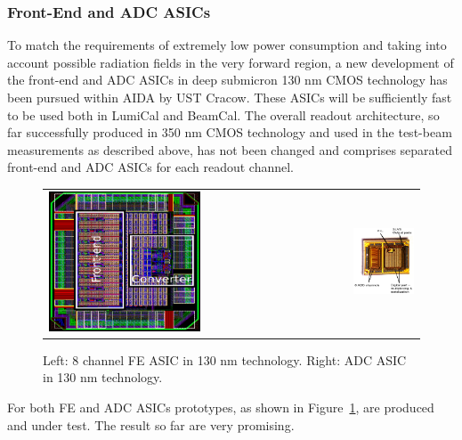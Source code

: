 \subsubsection{Front-End and ADC ASICs}



To match the requirements of extremely low power consumption and taking into account possible radiation
fields in the very forward region, a new development of the front-end and ADC ASICs in deep submicron
130 nm CMOS technology has been
pursued within AIDA by UST Cracow.
These ASICs will be sufficiently fast to be used both in LumiCal and BeamCal.
The overall readout architecture, so far successfully produced in 350 nm CMOS technology and used in the test-beam
measurements as described above, has not been changed and comprises separated front-end
and ADC ASICs for each readout channel.
\begin{figure}[htbp]
\begin{center}
 \begin{tabular}{rrr}
    \includegraphics[width=0.4\columnwidth]{Calorimeter/FCAL/figs/FE_ASIC.png}
     &~~~~~~&
 \includegraphics[width=0.4\textwidth]{Calorimeter/FCAL/figs/ADC_ASIC_2.png} \\

\end{tabular}
   \end{center}
          \caption{Left: 8 channel FE ASIC in 130 nm technology.
               Right: ADC ASIC in 130 nm technology.}
    \label{fig:ASIC_ADC}
\end{figure}
For both FE and ADC ASICs prototypes, as shown in Figure~\ref{fig:ASIC_ADC}, are produced and under test.
The result so far are very promising.


